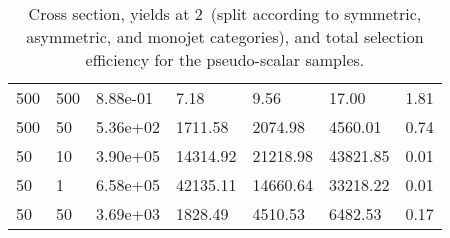 \begin{table}
\begin{tabular}{lllllll}
500       &   500       &   8.88e-01  &   7.18      &   9.56      &   17.00     &   1.81      \\ 
500       &   50        &   5.36e+02  &   1711.58   &   2074.98   &   4560.01   &   0.74      \\ 
50        &   10        &   3.90e+05  &   14314.92  &   21218.98  &   43821.85  &   0.01      \\ 
50        &   1         &   6.58e+05  &   42135.11  &   14660.64  &   33218.22  &   0.01      \\ 
50        &   50        &   3.69e+03  &   1828.49   &   4510.53   &   6482.53   &   0.17      \\ 
\hline
\end{tabular}
\caption{Cross section, yields at 2~\ifb (split according to symmetric, asymmetric, and monojet categories), and total selection efficiency for the pseudo-scalar \DMtt samples.}
\label{tab:dm_DMttP_g1_2fb}
\end{table}
